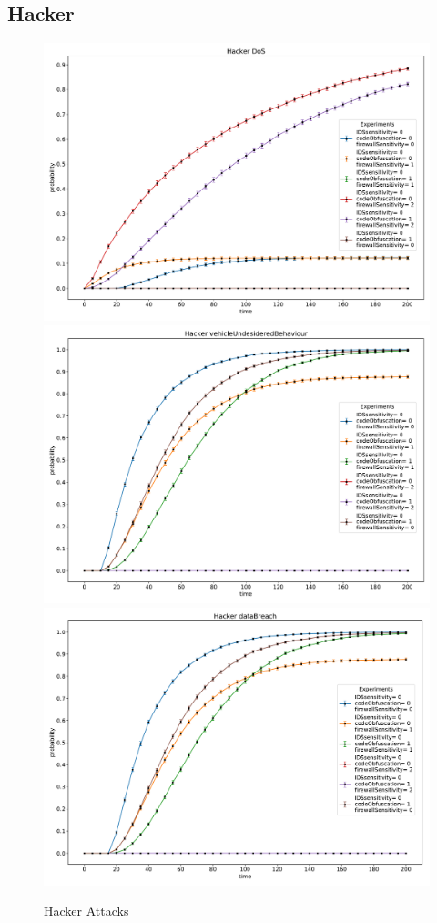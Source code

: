 \subsection*{Hacker}
\begin{figure}[H]
    \begin{center}
        \includegraphics[scale=0.3]{img/Hacker_DoS.pdf}
        \includegraphics[scale=0.3]{img/Hacker_vOB.pdf}
        \includegraphics[scale=0.3]{img/Hacker_dataBreach.pdf}
    \end{center}
    \caption{Hacker Attacks}
    \label{fig:Hacker_Attacks}
    \vspace*{-0.4cm}
\end{figure}
